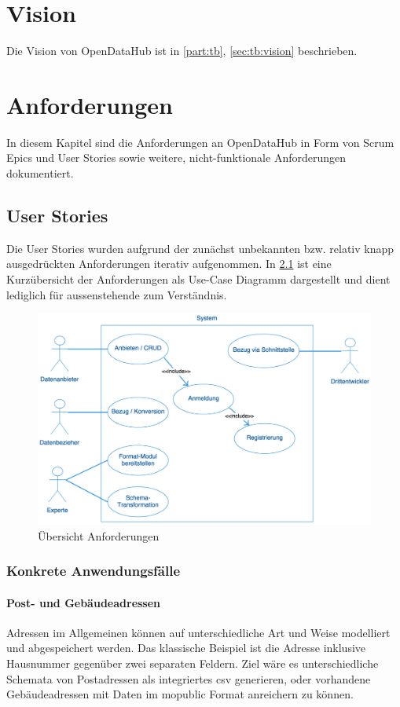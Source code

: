 \chapter{Vision}
Die Vision von OpenDataHub ist in \cref{part:tb}, \vref{sec:tb:vision} beschrieben.


\chapter{Anforderungen}
In diesem Kapitel sind die Anforderungen an OpenDataHub in Form von Scrum Epics und User Stories sowie weitere, nicht-funktionale Anforderungen dokumentiert.


\section{User Stories}\label{sec:pd:user-stories}

Die User Stories wurden aufgrund der zunächst unbekannten bzw. relativ knapp ausgedrückten Anforderungen iterativ aufgenommen. In \cref{fig:pd:uc-diagramm} ist eine Kurzübersicht der Anforderungen als Use-Case Diagramm dargestellt und dient lediglich für aussenstehende zum Verständnis.

\begin{figure}[H]
	\centering
	\includegraphics[width=0.9\linewidth]{fig/uc-diagramm}
	\caption{Übersicht Anforderungen}
	\label{fig:pd:uc-diagramm}
\end{figure}

\subsection{Konkrete Anwendungsfälle}
\label{sec:pd:usecases}

\subsubsection{Post- und Gebäudeadressen}
Adressen im Allgemeinen können auf unterschiedliche Art und Weise modelliert und abgespeichert werden. Das klassische Beispiel ist die Adresse inklusive Hausnummer gegenüber zwei separaten Feldern. Ziel wäre es unterschiedliche Schemata von Postadressen als integriertes \acs{csv} generieren, oder vorhandene Gebäudeadressen mit Daten im \gls{mopublic} Format anreichern zu können.

